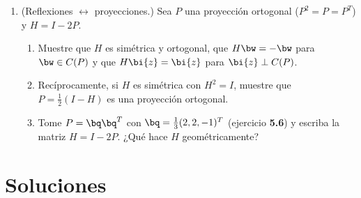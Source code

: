 \begin{enumerate}[leftmargin=*,label=\textbf{\thechapter.\arabic*}]
\item {} (Reflexiones $\leftrightarrow$ proyecciones.) Sea
$P$ una proyección ortogonal ($P^2=P=P^T$) y $H=I-2P$.
\begin{enumerate}[label=(\alph*)]
\item Muestre que $H$ es simétrica y ortogonal, que $H\bw=-\bw$ para
$\bw\in C(P)$ y que $H\bi{z}=\bi{z}$ para $\bi{z}\perp C(P)$.
\item Recíprocamente, si $H$ es simétrica con $H^2=I$, muestre que
$P=\frac12(I-H)$ es una proyección ortogonal.
\item Tome $P=\bq\bq^T$ con $\bq=\frac13(2,2,-1)^T$ (ejercicio
\textbf{5.6}) y escriba la matriz $H=I-2P$. ¿Qué hace $H$
geométricamente?
\end{enumerate}

\end{enumerate}

\section*{Soluciones}

